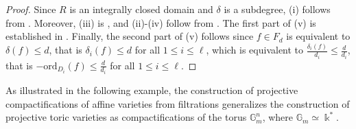 \documentclass[12pt,letterpaper, reqno]{amsart}
\theoremstyle{defstyle} \newtheorem{definition}[theorem]{Definition}
\theoremstyle{remark}
\numberwithin{equation}{section}
\numberwithin{figure}{section}
\newcommand{\kk} {\Bbbk}
\begin{document}
\begin{proof}
Since $R$ is an integrally closed domain and $\delta$ is a subdegree, (i)
follows from \cite[Proposition 2.2.7-Corollary 2.2.8]{mondal2010towards}.
Moreover, (iii) is \cite[Theorem 4.1, 3.]{mondal2014projective},
and (ii)-(iv) follow from \cite[Corollary 4.4-Proposition 5.2]{mondal2014projective}. The first part of (v) is established in \cite[Lemma 6.2]{mondal2014projective}. Finally, the second part of (v) follows since $f \in F_d$ is equivalent to $\delta(f) \leq d$, that is $\delta_i(f)\leq d$ for all $1 \leq i \leq \ell$, which is equivalent to $\frac{\delta_i(f)}{d_i} \leq \frac{d}{d_i}$, that is $-\mathrm{ord}_{D_i}(f) \leq \frac{d}{d_i}$ for all $1 \leq i \leq \ell$.
\end{proof}

As illustrated in the following example, the construction of projective compactifications of affine varieties from filtrations generalizes the construction of  projective toric varieties as  compactifications of the torus $\mathbb{G}_m^n$, where $\mathbb{G}_m \simeq \kk^*$.
\end{document}

